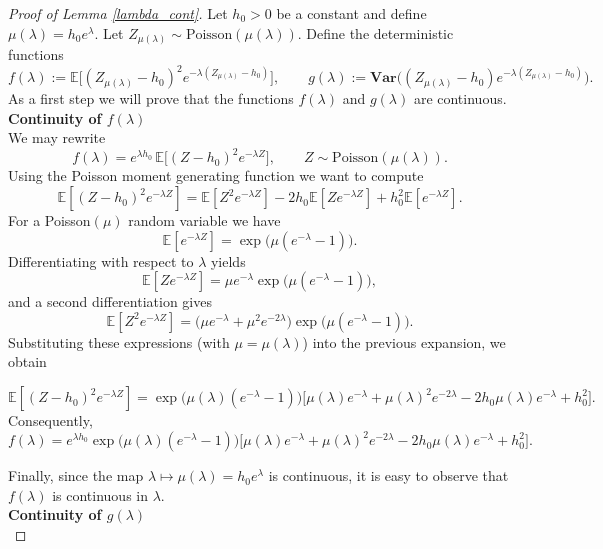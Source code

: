 \documentclass[12pt]{article}
\numberwithin{equation}{section}
\begin{document}
\begin{proof}[Proof of Lemma \ref{lambda_cont}]
Let $h_0>0$ be a constant and define $\mu(\lambda)=h_0 e^{\lambda}$. Let
$Z_{\mu(\lambda)} \sim \mathrm{Poisson}(\mu(\lambda))$. Define the deterministic functions
\[
f(\lambda):=\mathbb{E}\Big[(Z_{\mu(\lambda)}-h_0)^2e^{-\lambda(Z_{\mu(\lambda)}-h_0)}\Big],
\qquad
g(\lambda):=\mathbf{Var}\Big((Z_{\mu(\lambda)}-h_0)e^{-\lambda(Z_{\mu(\lambda)}-h_0)}\Big).
\] As a first step we will prove that the functions $f(\lambda)$ and $g(\lambda)$ are continuous.\\

\textbf{Continuity of $f(\lambda)$}\\


We may rewrite
\[
f(\lambda)
= e^{\lambda h_0}\,\mathbb{E}\Big[(Z-h_0)^2 e^{-\lambda Z}\Big],
\qquad Z\sim \mathrm{Poisson}(\mu(\lambda)).
\]
Using the Poisson moment generating function we want to compute
\[
\mathbb{E}[(Z-h_0)^2 e^{-\lambda Z}]
= \mathbb{E}[Z^2 e^{-\lambda Z}]
-2h_0 \mathbb{E}[Z e^{-\lambda Z}]
+ h_0^2 \mathbb{E}[e^{-\lambda Z}].
\]
For a Poisson$(\mu)$ random variable we have
\[
\mathbb{E}[e^{-\lambda Z}]
= \exp\!\big(\mu(e^{-\lambda}-1)\big).
\]
Differentiating with respect to $\lambda$ yields
\[
\mathbb{E}[Z e^{-\lambda Z}]
= \mu e^{-\lambda}
\exp\!\big(\mu(e^{-\lambda}-1)\big),
\]
and a second differentiation gives
\[
\mathbb{E}[Z^2 e^{-\lambda Z}]
= \big(\mu e^{-\lambda}+\mu^2 e^{-2\lambda}\big)
\exp\!\big(\mu(e^{-\lambda}-1)\big).
\]
Substituting these expressions (with $\mu=\mu(\lambda)$) into the
previous expansion, we obtain

\[\mathbb{E}[(Z-h_0)^2 e^{-\lambda Z}]
= \exp\!\big(\mu(\lambda)(e^{-\lambda}-1)\big)
\Big[
\mu(\lambda)e^{-\lambda}
+ \mu(\lambda)^2 e^{-2\lambda}
-2h_0 \mu(\lambda)e^{-\lambda}
+ h_0^2
\Big].\]
Consequently,
\[
f(\lambda)
= e^{\lambda h_0}
\exp\!\big(\mu(\lambda)(e^{-\lambda}-1)\big)
\Big[
\mu(\lambda)e^{-\lambda}
+ \mu(\lambda)^2 e^{-2\lambda}
-2h_0 \mu(\lambda)e^{-\lambda}
+ h_0^2
\Big].
\]

Finally, since the map $\lambda\mapsto \mu(\lambda)=h_0 e^{\lambda}$ is continuous, it is easy to observe that $f(\lambda)$ is continuous in $\lambda$.\\ 

\textbf{Continuity of $g(\lambda)$}\\


\end{proof}
\end{document}
